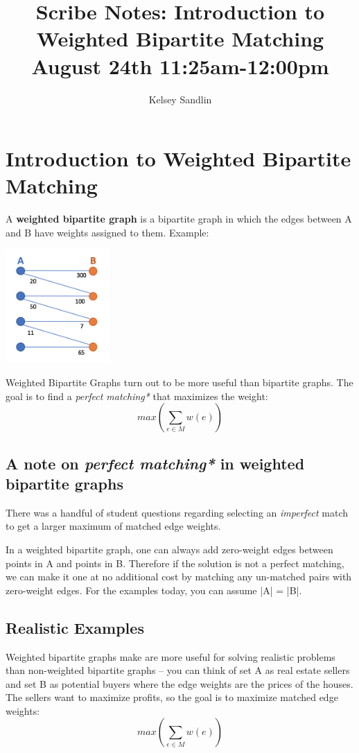 \documentclass[a4paper]{article}
\title{Scribe Notes: Introduction to Weighted Bipartite Matching
August 24th 11:25am-12:00pm}
\author{Kelsey Sandlin}
\date{}
\begin{document}
\maketitle

\section{Introduction to Weighted Bipartite Matching}

A \textbf{weighted bipartite graph} is a bipartite graph in which the edges between A and B have weights assigned to them. Example:
\begin{center}
\includegraphics[width=4cm]{SampleWeighted.png}
\end{center}
Weighted Bipartite Graphs turn out to be more useful than bipartite graphs. 
The goal is to find a \textit{perfect matching*} that maximizes the weight:
\[max(\sum_{e\in M} w(e))\]

\subsection{A note on \textit{perfect matching*} in weighted bipartite graphs} 
There was a handful of student questions regarding selecting an \textit{imperfect} match to get a larger maximum of matched edge weights. 

In a weighted bipartite graph, one can always add zero-weight edges between points in A and points in B. Therefore if the solution is not a perfect matching, we can make it one at no additional cost by matching any un-matched pairs with zero-weight edges. For the examples today, you can  assume |A| = |B|.

\subsection{Realistic Examples}
Weighted bipartite graphs make are more useful for solving realistic problems than non-weighted bipartite graphs – you can think of set A as real estate sellers and set B as potential buyers where the edge weights are the prices of the houses. The sellers want to maximize profits, so the goal is to maximize matched edge weights:
	\[max(\sum_{e\in M} w(e))\]
\end{document}

